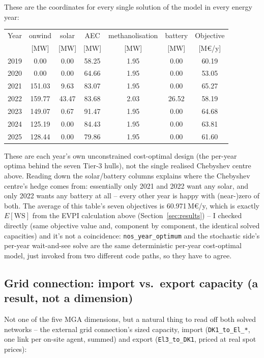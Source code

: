 \documentclass[11pt]{article}
\begin{document}
These are the coordinates for every single solution of the model in every energy year:

\begin{center}
\footnotesize
\begin{tabular}{@{}lcccccc@{}}
\toprule
Year & onwind & solar & AEC & methanolisation & battery & Objective \\
     & [MW] & [MW] & [MW] & [MW] & [MW] & [M€/y] \\
\midrule
2019 & 0.00   & 0.00  & 58.25 & 1.95 & 0.00  & 60.19 \\
2020 & 0.00   & 0.00  & 64.66 & 1.95 & 0.00  & 53.05 \\
2021 & 151.03 & 9.63  & 83.07 & 1.95 & 0.00  & 65.27 \\
2022 & 159.77 & 43.47 & 83.68 & 2.03 & 26.52 & 58.19 \\
2023 & 149.07 & 0.67  & 91.47 & 1.95 & 0.00  & 64.68 \\
2024 & 125.19 & 0.00  & 84.43 & 1.95 & 0.00  & 63.81 \\
2025 & 128.44 & 0.00  & 79.86 & 1.95 & 0.00  & 61.60 \\
\bottomrule
\end{tabular}
\end{center}

These are each year's own unconstrained cost-optimal design (the per-year
optima behind the seven Tier-3 hulls), not the single realised Chebyshev
centre above. Reading down the solar/battery columns explains where the
Chebyshev centre's hedge comes from: essentially only 2021 and 2022 want
any solar, and only 2022 wants any battery at all -- every other year is
happy with (near-)zero of both. The average of this table's seven
objectives is 60.971\,M€/y, which is exactly $E[\mathrm{WS}]$ from the
EVPI calculation above (Section~\ref{sec:results}) -- I checked directly
(same objective value and, component by component, the identical solved
capacities) and it's not a coincidence: \texttt{nos\_year\_optimum} and the
stochastic side's per-year wait-and-see solve are the same deterministic
per-year cost-optimal model, just invoked from two different code paths,
so they have to agree.

\subsection{Grid connection: import vs.\ export capacity (a result, not a dimension)}
Not one of the five MGA dimensions, but a natural thing to read off both
solved networks -- the external grid connection's sized capacity, import
(\texttt{DK1\_to\_El\_*}, one link per on-site agent, summed) and export
(\texttt{El3\_to\_DK1}, priced at real spot prices):
\end{document}
